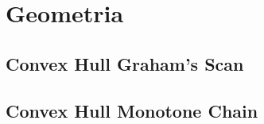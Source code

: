 \section{Geometria}

\subsection{Convex Hull Graham's Scan}


\subsection{Convex Hull Monotone Chain}
